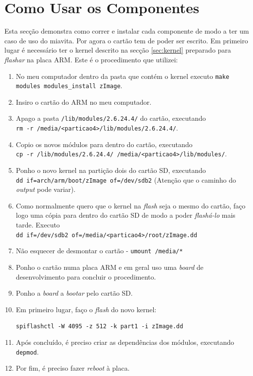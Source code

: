 \documentclass[10pt,a4paper,oneside]{book}
\begin{document}
    
  
  
\chapter{Como Usar os Componentes}

	Esta secção demonstra como correr e instalar cada componente de modo a ter um caso de uso do miavita. Por agora o cartão tem de poder ser escrito. Em primeiro lugar é necessário ter o kernel descrito na secção \ref{sec:kernel} preparado para \emph{flashar} na placa ARM. Este é o procedimento que utilizei:
	
	\begin{enumerate}
		\item No meu computador dentro da pasta que contém o kernel executo {\tt make modules modules\_install zImage}.
		\item Insiro  o cartão do ARM no meu computador.
		\item Apago a pasta {\tt /lib/modules/2.6.24.4/} do cartão, executando\\ {\tt rm -r /media/<particao4>/lib/modules/2.6.24.4/}.
		\item Copio os novos módulos para dentro do cartão, executando\\ {\tt cp -r /lib/modules/2.6.24.4/ /media/<particao4>/lib/modules/}.
		\item Ponho o novo kernel na partição dois do cartão SD, executando\\ {\tt dd if=arch/arm/boot/zImage of=/dev/sdb2} (Atenção que o caminho do \emph{output} pode variar).
		\item Como normalmente quero que o kernel na \emph{flash} seja o mesmo do cartão, faço logo uma cópia para dentro do cartão SD de modo a poder \emph{flashá-lo} mais tarde. Executo \\{\tt dd if=/dev/sdb2 of=/media/<particao4>/root/zImage.dd}
		\item Não esquecer de desmontar o cartão - {\tt umount /media/*}
		\item Ponho o cartão numa placa ARM e em geral uso uma \emph{board} de desenvolvimento para concluir o procedimento.
		\item Ponho a \emph{board} a \emph{bootar} pelo cartão SD.
		\item Em primeiro lugar, faço o \emph{flash} do novo kernel:
			\begin{flushleft}
				{\tt spiflashctl -W 4095 -z 512 -k part1 -i zImage.dd}
			\end{flushleft}
		\item Após concluído, é preciso criar as dependências dos módulos, executando {\tt depmod}.
		\item Por fim, é preciso fazer \emph{reboot} à placa.
	\end{enumerate}
\end{document}
